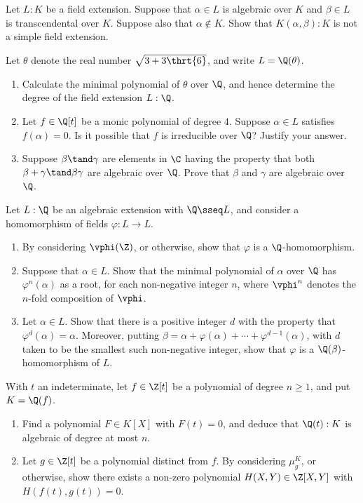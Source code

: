 \documentclass{article}
\begin{document}
 Let \( L : K \) be a field extension.
Suppose that \( \alpha \in L \) is algebraic over \( K \) and \( \beta \in L \) is transcendental over \( K \).
Suppose also that \( \alpha \notin K \). Show that \( K(\alpha, \beta) : K \) is not a simple field extension.

 Let \( \theta \) denote the real number \( \sqrt{3 + 3\thrt{6}} \), and write \( L = \Q(\theta) \).
\begin{enumerate}[label=(\alph*)]
  \item Calculate the minimal polynomial of \( \theta \) over \( \Q \), and hence determine the degree of the field extension \( L : \Q \).

  \item Let \( f \in \Q[t] \) be a monic polynomial of degree \( 4 \).
  Suppose \( \alpha \in L \) satisfies \( f(\alpha) = 0 \).
  Is it possible that \( f \) is irreducible over \( \Q \)?
  Justify your answer.

  \item Suppose \( \beta \tand \gamma \) are elements in \( \C \) having the property that both \( \beta + \gamma\tand \beta \gamma \) are algebraic over \( \Q \).
  Prove that \( \beta \) and \( \gamma \) are algebraic over \( \Q \).
\end{enumerate}

 Let \( L : \Q \) be an algebraic extension with \( \Q\sseq L \), and consider a homomorphism of fields \( \varphi : L \to L \).
\begin{enumerate}[label=(\alph*)]
  \item By considering \( \vphi(\Z) \), or otherwise, show that \( \varphi \) is a \( \Q \)-homomorphism.

  \item Suppose that \( \alpha \in L \).
  Show that the minimal polynomial of \( \alpha \) over \( \Q \) has \( \varphi^n(\alpha) \) as a root, for each non-negative integer \( n \), where \( \vphi^{n} \) denotes the \( n \)-fold composition of \( \vphi \).

  \item Let \( \alpha\in L \).
  Show that there is a positive integer \( d \) with the property that \( \varphi^d(\alpha) = \alpha \).
  Moreover, putting \( \beta = \alpha + \varphi(\alpha) + \cdots + \varphi^{d-1}(\alpha) \), with \( d \) taken to be the smallest such non-negative integer, show that \( \varphi \) is a \( \Q(\beta) \)-homomorphism of \( L \).
\end{enumerate}

 With \( t \) an indeterminate, let \( f \in \Z[t] \) be a polynomial of degree \( n \geq 1 \), and put \( K = \Q(f) \).
\begin{enumerate}[label=(\alph*)]
  \item Find a polynomial \( F \in K[X] \) with \( F(t) = 0 \), and deduce that \( \Q(t) : K \) is algebraic of degree at most \( n \).

  \item Let \( g \in \Z[t] \) be a polynomial distinct from \( f \).
  By considering \( \mu_g^{K} \), or otherwise, show there exists a non-zero polynomial \( H(X, Y) \in \Z[X, Y] \) with \( H(f(t), g(t)) = 0 \).
\end{enumerate}
\end{document}
